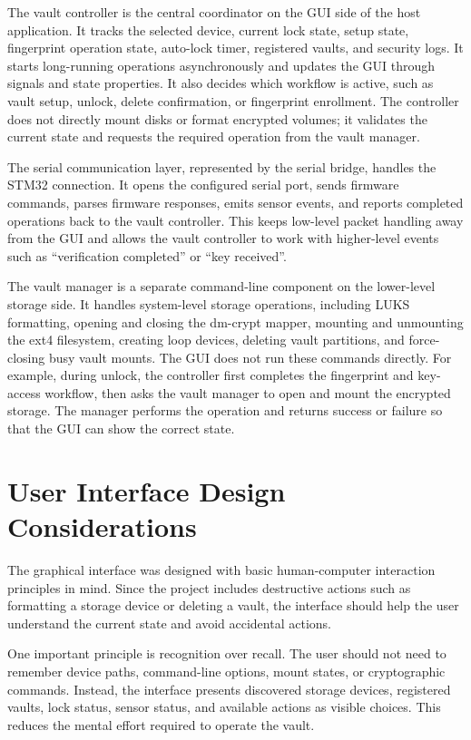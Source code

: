 The vault controller is the central coordinator on the GUI side of the host application. It tracks the selected device, current lock state, setup state, fingerprint operation state, auto-lock timer, registered vaults, and security logs. It starts long-running operations asynchronously and updates the GUI through signals and state properties. It also decides which workflow is active, such as vault setup, unlock, delete confirmation, or fingerprint enrollment. The controller does not directly mount disks or format encrypted volumes; it validates the current state and requests the required operation from the vault manager.

The serial communication layer, represented by the serial bridge, handles the STM32 connection. It opens the configured serial port, sends firmware commands, parses firmware responses, emits sensor events, and reports completed operations back to the vault controller. This keeps low-level packet handling away from the GUI and allows the vault controller to work with higher-level events such as ``verification completed'' or ``key received''.

The vault manager is a separate command-line component on the lower-level storage side. It handles system-level storage operations, including LUKS formatting, opening and closing the dm-crypt mapper, mounting and unmounting the ext4 filesystem, creating loop devices, deleting vault partitions, and force-closing busy vault mounts. The GUI does not run these commands directly. For example, during unlock, the controller first completes the fingerprint and key-access workflow, then asks the vault manager to open and mount the encrypted storage. The manager performs the operation and returns success or failure so that the GUI can show the correct state.

\section{User Interface Design Considerations}

The graphical interface was designed with basic human-computer interaction principles in mind. Since the project includes destructive actions such as formatting a storage device or deleting a vault, the interface should help the user understand the current state and avoid accidental actions.

One important principle is recognition over recall. The user should not need to remember device paths, command-line options, mount states, or cryptographic commands. Instead, the interface presents discovered storage devices, registered vaults, lock status, sensor status, and available actions as visible choices. This reduces the mental effort required to operate the vault.


